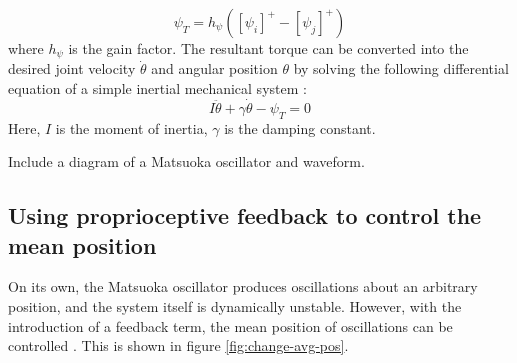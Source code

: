 \documentclass[12pt,twoside]{article}
\theoremstyle{plain}
\theoremstyle{definition}
\theoremstyle{remark}
\begin{document}
\begin{equation}
\psi_T=h_{\psi}([\psi_i]^+ - [\psi_j]^+)
\end{equation}
where $h_{\psi}$ is the gain factor. The resultant torque can be converted into the desired joint velocity $\dot{\theta}$ and angular position $\theta$ by solving the following differential equation of a simple inertial mechanical system \cite{Ronsse2009}:
\begin{equation}
I\ddot{\theta} + \gamma \dot{\theta} - \psi_T = 0
\end{equation}
Here, $I$ is the moment of inertia, $\gamma$ is the damping constant.

Include a diagram of a Matsuoka oscillator and waveform.

\subsection{Using proprioceptive feedback to control the mean position}
On its own, the Matsuoka oscillator produces oscillations about an arbitrary position, and the system itself is dynamically unstable. However, with the introduction of a feedback term, the mean position of oscillations can be controlled \cite{ronsse2009computational}. This is shown in figure \ref{fig:change-avg-pos}.
\end{document}
